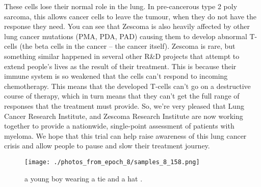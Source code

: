 \documentclass{article}%
\begin{document}
These cells lose their normal role in the lung.\newline%
In pre{-}cancerous type 2 poly sarcoma, this allows cancer cells to leave the tumour, when they do not have the response they need.\newline%
You can see that Zescoma is also heavily affected by other lung cancer mutations (PMA, PDA, PAD) causing them to develop abnormal T{-}cells (the beta cells in the cancer – the cancer itself).\newline%
Zescoma is rare, but something similar happened in several other R\&D projects that attempt to extend people’s lives as the result of their treatment.\newline%
This is because their immune system is so weakened that the cells can’t respond to incoming chemotherapy.\newline%
This means that the developed T{-}cells can’t go on a destructive course of therapy, which in turn means that they can’t get the full range of responses that the treatment must provide.\newline%
So, we’re very pleased that Lung Cancer Research Institute, and Zescoma Research Institute are now working together to provide a nationwide, single{-}point assessment of patients with myeloma.\newline%
We hope that this trial can help raise awareness of this lung cancer crisis and allow people to pause and slow their treatment journey.\newline%

%


\begin{figure}[h!]%
\centering%
\texttt{[image: ./photos\_from\_epoch\_8/samples\_8\_158.png]}%
\caption{a young boy wearing a tie and a hat .}%
\end{figure}

%
\end{document}
